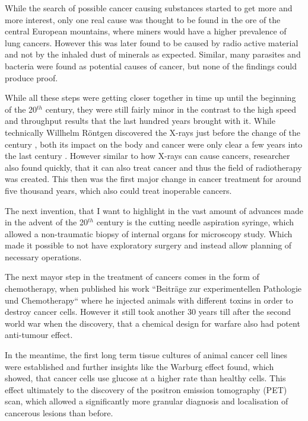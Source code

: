 While the search of possible cancer causing substances started to get more and more interest, only one real cause was thought to be found in the ore of the central European mountains, where miners would have a higher prevalence of lung cancers. However this was later found to be caused by radio active material and not by the inhaled dust of minerals as expected. Similar, many parasites and bacteria were found as potential causes of cancer, but none of the findings could produce proof.

While all these steps were getting closer together in time up until the beginning of the 20$^{th}$ century, they were still fairly minor in the contrast to the high speed and throughput results that the last hundred years brought with it. While technically Willhelm R\"ontgen discovered the X-rays just before the change of the century \cite{Roentgen1898}, both its impact on the body and cancer were only clear a few years into the last century \cite{Frieben1902,Scholtz1902}. However similar to how X-rays can cause cancers, researcher also found quickly, that it can also treat cancer and thus the field of radiotherapy was created. This then was the first major change in cancer treatment for around five thousand years, which also could treat inoperable cancers.

The next invention, that I want to highlight in the vast amount of advances made in the advent of the 20$^{th}$ century is the cutting needle aspiration syringe, which allowed a non-traumatic biopsy of internal organs for microscopy study. Which made it possible to not have exploratory surgery and instead allow planning of necessary operations.

The next mayor step in the treatment of cancers comes in the form of chemotherapy, when \textcite{Ehrlich1909} published his work ``Beitr\"age zur experimentellen Pathologie und Chemotherapy`` where he injected animals with different toxins in order to destroy cancer cells. However it still took another 30 years till after the second world war when the discovery, that a chemical design for warfare also had potent anti-tumour effect.

In the meantime, the first long term tissue cultures of animal cancer cell lines were established and further insights like the Warburg effect \cite{Warburg1928} found, which showed, that cancer cells use glucose at a higher rate than healthy cells. This effect ultimately to the discovery of the positron emission tomography (PET) scan, which allowed a significantly more granular diagnosis and localisation of cancerous lesions than before.

